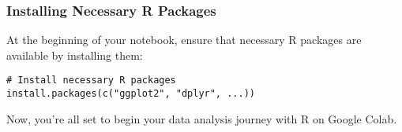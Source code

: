 \documentclass[a4paper,12pt]{book}
\begin{document}
\subsubsection*{Installing Necessary R Packages}
At the beginning of your notebook, ensure that necessary R packages are available by installing them:

\begin{verbatim}
# Install necessary R packages
install.packages(c("ggplot2", "dplyr", ...))
\end{verbatim}

Now, you're all set to begin your data analysis journey with R on Google Colab.



\cleardoublepage %
\printbibliography
\end{document}
